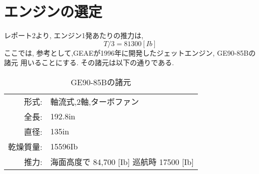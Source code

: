 \documentclass[class=article, crop=false, dvipdfmx, fleqn]{standalone}
\begin{document}
\section{エンジンの選定}
レポート2より, エンジン1発あたりの推力は,
\begin{equation}
  T/3 = 81300 [Ib]
\end{equation}
ここでは, 参考として,GEAEが1996年に開発したジェットエンジン, GE90-85Bの諸元
用いることにする. その諸元は以下の通りである.
\begin{table}[H]
  \begin{center}
  \begin{tabular}{rl}
    形式: & 軸流式,2軸,ターボファン \\
    全長:& 192.8in \\
    直径: & 135in \\
    乾燥質量: & 15596Ib \\
    推力: & 海面高度で 84,700 [Ib] \quad 巡航時 17500 [Ib]
  \end{tabular}
  \caption{GE90-85Bの諸元}
\end{center}
\end{table}
\end{document}
